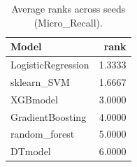 \begin{table}[t]
\centering
\begin{tabular}{lr}
\toprule
Model & rank \\
\midrule
LogisticRegression & 1.3333 \\
sklearn_SVM & 1.6667 \\
XGBmodel & 3.0000 \\
GradientBoosting & 4.0000 \\
random_forest & 5.0000 \\
DTmodel & 6.0000 \\
\bottomrule
\end{tabular}
\caption{Average ranks across seeds (Micro_Recall).}
\label{tab:avg_rank_Micro_Recall}
\end{table}
